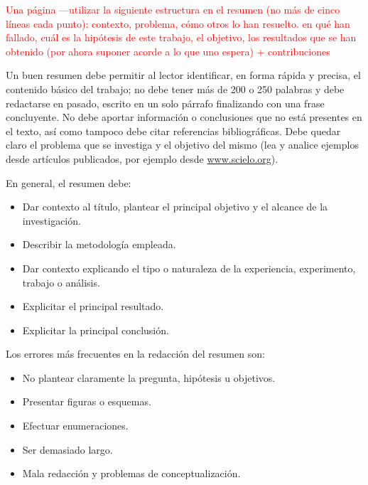 \documentclass[copyright]{tesisunab}
\begin{document}
	\begin{resumenEs}
		\textcolor{red}{Una página ---utilizar la siguiente estructura en el resumen (no más de cinco líneas cada punto): contexto, problema, cómo otros lo han resuelto. en qué han fallado, cuál es la hipótesis de este trabajo, el objetivo, los resultados que se han obtenido (por ahora suponer acorde a lo que uno espera) + contribuciones}
		
		Un buen resumen debe permitir al lector identificar, en forma rápida y precisa, el contenido básico del trabajo; no debe tener más de 200 o 250 palabras y debe redactarse en pasado, escrito en un solo párrafo finalizando con una frase concluyente. No debe aportar información o conclusiones que no está presentes en el texto, así como tampoco debe  citar referencias bibliográficas. Debe quedar claro el problema que se investiga y el objetivo del mismo (lea y analice ejemplos desde artículos publicados, por ejemplo desde \url{www.scielo.org}).
		
		En general, el resumen debe:  
		\begin{itemize}	
			\item Dar contexto al título, plantear el principal objetivo y el alcance de la investigación. \item Describir la metodología empleada.
			\item Dar contexto explicando el tipo o naturaleza de la experiencia, experimento, trabajo o análisis.
			\item Explicitar el principal resultado.
			\item Explicitar la principal conclusión.
		\end{itemize}
	
		Los errores más frecuentes en la redacción del resumen son: 
		\begin{itemize}
			\item No plantear claramente la pregunta, hipótesis u objetivos.
			\item Presentar figuras o esquemas.
			\item Efectuar enumeraciones.
			\item Ser demasiado largo.
			\item Mala redacción y problemas de conceptualización.
		\end{itemize}
	\end{resumenEs}
	
\end{document}
